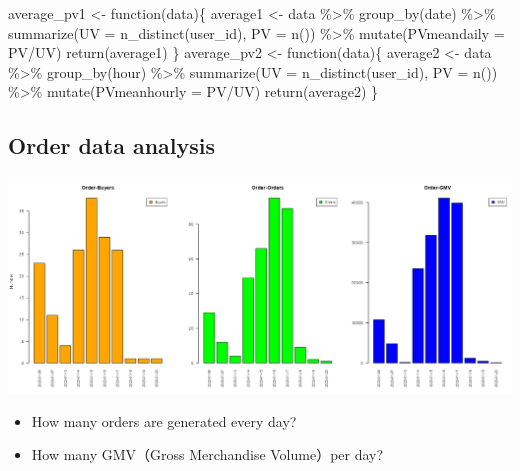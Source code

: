 \documentclass[
  11pt,
]{article}
\newenvironment{Shaded}{\begin{snugshade}}{\end{snugshade}}
\newcommand{\AttributeTok}[1]{\textcolor[rgb]{0.40,0.45,0.13}{#1}}
\newcommand{\ControlFlowTok}[1]{\textcolor[rgb]{0.00,0.23,0.31}{#1}}
\newcommand{\FunctionTok}[1]{\textcolor[rgb]{0.28,0.35,0.67}{#1}}
\newcommand{\NormalTok}[1]{\textcolor[rgb]{0.00,0.23,0.31}{#1}}
\newcommand{\OtherTok}[1]{\textcolor[rgb]{0.00,0.23,0.31}{#1}}
\newcommand{\SpecialCharTok}[1]{\textcolor[rgb]{0.37,0.37,0.37}{#1}}
\begin{document}
\begin{Shaded}
\begin{Highlighting}[]
\NormalTok{average\_pv1 }\OtherTok{\textless{}{-}} \ControlFlowTok{function}\NormalTok{(data)\{}
\NormalTok{  average1 }\OtherTok{\textless{}{-}}
\NormalTok{    data }\SpecialCharTok{\%\textgreater{}\%}
    \FunctionTok{group\_by}\NormalTok{(date) }\SpecialCharTok{\%\textgreater{}\%}
    \FunctionTok{summarize}\NormalTok{(}\AttributeTok{UV =} \FunctionTok{n\_distinct}\NormalTok{(user\_id), }\AttributeTok{PV =} \FunctionTok{n}\NormalTok{()) }\SpecialCharTok{\%\textgreater{}\%}
    \FunctionTok{mutate}\NormalTok{(}\AttributeTok{PVmeandaily =}\NormalTok{ PV}\SpecialCharTok{/}\NormalTok{UV)}
  \FunctionTok{return}\NormalTok{(average1)}
\NormalTok{\}}
\NormalTok{average\_pv2 }\OtherTok{\textless{}{-}} \ControlFlowTok{function}\NormalTok{(data)\{}
\NormalTok{  average2 }\OtherTok{\textless{}{-}}
\NormalTok{    data }\SpecialCharTok{\%\textgreater{}\%}
    \FunctionTok{group\_by}\NormalTok{(hour) }\SpecialCharTok{\%\textgreater{}\%}
    \FunctionTok{summarize}\NormalTok{(}\AttributeTok{UV =} \FunctionTok{n\_distinct}\NormalTok{(user\_id), }\AttributeTok{PV =} \FunctionTok{n}\NormalTok{()) }\SpecialCharTok{\%\textgreater{}\%}
    \FunctionTok{mutate}\NormalTok{(}\AttributeTok{PVmeanhourly =}\NormalTok{ PV}\SpecialCharTok{/}\NormalTok{UV)}
  \FunctionTok{return}\NormalTok{(average2)}
\NormalTok{\}}
\end{Highlighting}
\end{Shaded}

\hypertarget{order-data-analysis}{%
\subsection{Order data analysis}\label{order-data-analysis}}

\includegraphics{img/order.png}

\begin{itemize}
\item
  How many orders are generated every day?
\item
  How many GMV（Gross Merchandise Volume）per day?
\end{itemize}
\end{document}
